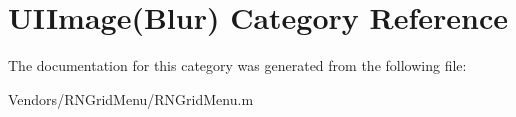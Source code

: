 \hypertarget{category_u_i_image_07_blur_08}{}\section{U\+I\+Image(Blur) Category Reference}
\label{category_u_i_image_07_blur_08}


The documentation for this category was generated from the following file\+:\begin{DoxyCompactItemize}
\item 
Vendors/\+R\+N\+Grid\+Menu/R\+N\+Grid\+Menu.\+m\end{DoxyCompactItemize}
